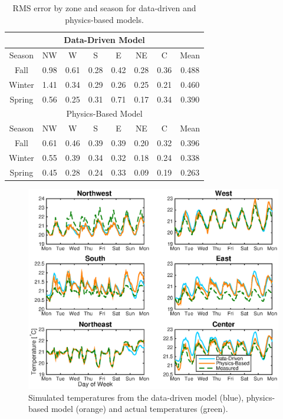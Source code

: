 \begin{table}[hbtp]
\centering
\begin{tabular}{*8c}
\toprule
\multicolumn{8}{c}{Data-Driven Model} \\
\hline
Season & NW & W & S & E & NE & C & Mean \\ \hline
Fall & 0.98 & 0.61 & 0.28 & 0.42 & 0.28 & 0.36 & 0.488\\
Winter & 1.41 & 0.34 & 0.29 & 0.26 & 0.25 & 0.21 & 0.460\\
Spring & 0.56 & 0.25 & 0.31 & 0.71 & 0.17 & 0.34 & 0.390\\
\midrule
\midrule
\multicolumn{8}{c}{Physics-Based Model} \\
\hline
Season & NW & W & S & E & NE & C & Mean \\ \hline
Fall & 0.61 & 0.46 & 0.39 & 0.39 & 0.20 & 0.32 & 0.396\\
Winter & 0.55 & 0.39 & 0.34 & 0.32 & 0.18 & 0.24 & 0.338\\
Spring & 0.45 & 0.28 & 0.24 & 0.33 & 0.09 & 0.19 & 0.263\\
\bottomrule
\end{tabular}
\caption{RMS error by zone and season for data-driven and physics-based models.}
\label{tab:data_RMS_zones}
\end{table}



\begin{figure}
\centering
\vspace*{-0.1cm}
\includegraphics[width=\textwidth]{chapters/building_model/figures/open_loop_traj.eps}
\vspace*{-0.5cm}
\caption{Simulated temperatures from the data-driven model (blue), physics-based model (orange) and actual temperatures (green). }
\vspace*{-0.5cm}
\label{fig:open_loop_trajectories}
\end{figure}

